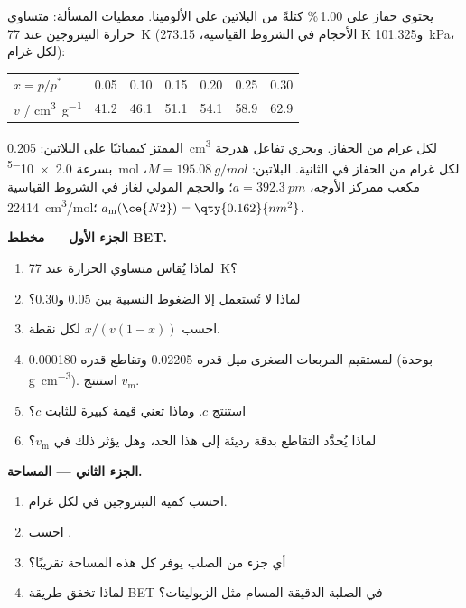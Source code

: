 \begin{problem}
\label{pb:b3:surfaces-catalysis:1}
يحتوي حفاز على 1.00\,\% كتلةً من البلاتين على الألومينا. معطيات المسألة:
متساوي حرارة النيتروجين عند \qty{77}{K} (الأحجام في الشروط القياسية، 273.15 K 
و\qty{101.325}{kPa}، لكل غرام):
\begin{center}\small
\begin{tabular}{lcccccc}
\hline
$x = p/p^*$ & 0.05 & 0.10 & 0.15 & 0.20 & 0.25 & 0.30 \\
$v$ / \unit{cm^3.g^{-1}} & 41.2 & 46.1 & 51.1 & 54.1 & 58.9 & 62.9 \\ \hline
\end{tabular}
\end{center}
 الممتز كيميائيًا على البلاتين: \qty{0.205}{cm^3} لكل غرام من الحفاز. ويجري تفاعل هدرجة
بسرعة \qty{2.0e-5}{mol} لكل غرام من الحفاز في الثانية. البلاتين: $M = \qty{195.08}{g/mol}$، مكعب ممركز الأوجه،
$a = \qty{392.3}{pm}$؛ والحجم المولي لغاز في الشروط القياسية \qty{22414}{cm^3/mol}؛
$a_{\mathrm m}(\ce{N2}) = \qty{0.162}{nm^2}$.

\medskip\noindent\textbf{الجزء الأول --- مخطط BET.}
\begin{enumerate}
  \item لماذا يُقاس متساوي الحرارة عند \qty{77}{K}؟
  \item لماذا لا تُستعمل إلا الضغوط النسبية بين 0.05 و0.30؟
  \item احسب $x/(v(1 - x))$ لكل نقطة.
  \item لمستقيم المربعات الصغرى ميل قدره \num{0.02205} وتقاطع قدره \num{0.000180} (بوحدة
        \unit{g.cm^{-3}}). استنتج $v_{\mathrm m}$.
  \item استنتج $c$. وماذا تعني قيمة كبيرة للثابت $c$؟
  \item لماذا يُحدَّد التقاطع بدقة رديئة إلى هذا الحد، وهل يؤثر ذلك في $v_{\mathrm m}$؟
\end{enumerate}

\medskip\noindent\textbf{الجزء الثاني --- المساحة.}
\begin{enumerate}[resume]
  \item احسب كمية النيتروجين في  لكل غرام.
  \item احسب .
  \item أي جزء من الصلب يوفر كل هذه المساحة تقريبًا؟
  \item لماذا تخفق طريقة BET في الصلبة الدقيقة المسام مثل الزيوليتات؟
\end{enumerate}


\end{problem}
